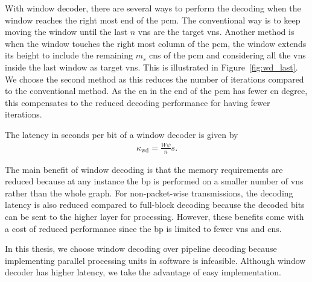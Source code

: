 With window decoder, there are several ways to perform the decoding when the window reaches the right most end of the \gls{pcm}. The conventional way is to keep moving the window until the last $n$ \glspl{vn} are the target \glspl{vn}. Another method is when the window touches the right most column of the \gls{pcm}, the window extends its height to include the remaining $m_s$ \glspl{cn} of the \gls{pcm} and considering all the \glspl{vn} inside the last window as target \glspl{vn}. This is illustrated in Figure~\ref{fig:wd_last}. We choose the second method as this reduces the number of iterations compared to the conventional method. As the \gls{cn} in the end of the \gls{pcm} has fewer \gls{cn} degree, this compensates to the reduced decoding performance for having fewer iterations.

The latency in seconds per bit of a window decoder is given by
\begin{align}
\kappa_{\text{wd}}=\frac{W\psi}{n}s.
\end{align}

The main benefit of window decoding is that the memory requirements are reduced because at any instance the \gls{bp} is performed on a smaller number of \glspl{vn} rather than the whole graph. For non-packet-wise transmissions, the decoding latency is also reduced compared to full-block decoding because the decoded bits can be sent to the higher layer for processing. However, these benefits come with a cost of reduced performance since the \gls{bp} is limited to fewer \glspl{vn} and \glspl{cn}.

In this thesis, we choose window decoding over pipeline decoding because implementing parallel processing units in software is infeasible. Although window decoder has higher latency, we take the advantage of easy implementation.

